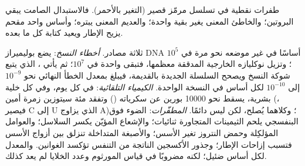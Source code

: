 \begin{omfigure}

{\small طفرات نقطية في تسلسل مرمّز قصير (التغير بالأحمر). فالاستبدال
الصامت يبقي البروتين؛ والخاطئ المعنى يغير بقية واحدة؛ والعديم
المعنى يبتره؛ وأساس واحد مقحم يزيح الإطار ويعيد كتابة كل ما بعده.}
\end{omfigure}

\begin{proposition}\label{prop:b2:genome-diversification:sources}
ثلاثة مصادر. \emph{أخطاء النسخ}: يضع بوليميراز DNA أساسًا في غير
موضعه نحو مرة في $10^{5}$؛ وتزيل نوكليازه الخارجية المدققة معظمها،
فتبقى واحدة في $10^{7}$؛ ثم يأتي ، الذي يتبع شوكة
النسخ ويصحح السلسلة الجديدة بالقديمة، فيبلغ بمعدل الخطأ النهائي نحو
$10^{-9}$ إلى $10^{-10}$ لكل أساس في النسخة الواحدة.
\emph{الكيمياء التلقائية}: في كل يوم، وفي كل خلية بشرية، يسقط نحو
\num{10000} بورين عن سكرياته (\emph{}) وتفقد مئة سيتوزين
زمرة أمين (\emph{}، فيصير C إلى U الذي يزاوج A)؛ وكلاهما
يُصلح، لكن ليس دائمًا. \emph{المطفّرات}: الضوء فوق البنفسجي يلحم
الثيمينات المتجاورة ثنائيات؛ والإشعاع المؤيّن يكسر السلاسل؛
والعوامل المؤلكِلة وحمض النتروز تغير الأسس؛ والأصبغة المتداخلة
تنزلق بين أزواج الأسس فتسبب إزاحات الإطار؛ وجذور الأكسجين الناتجة
من التنفس تؤكسد الغوانين. والمعدل لكل أساس ضئيل؛ لكنه مضروبًا في
قياس المورثوم وعدد الخلايا لم يعد كذلك.
\end{proposition}

